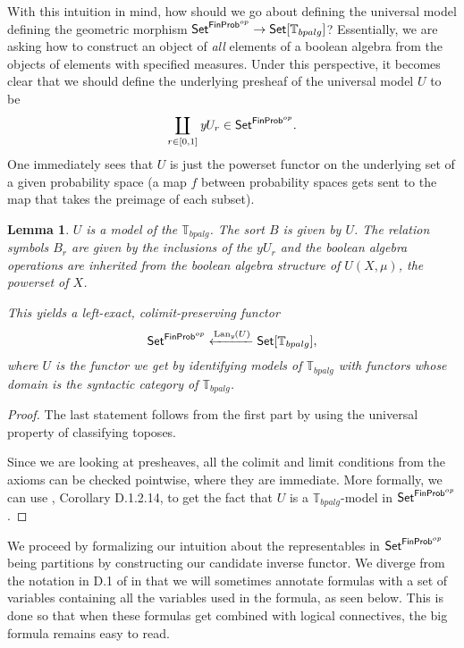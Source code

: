 \documentclass[a4paper]{amsproc}
\theoremstyle{plain}
\newtheorem{lemma}[theorem]{Lemma}
\theoremstyle{definition}
\theoremstyle{remark}
\numberwithin{equation}{section}
\newcommand{\y}{\textit{y}}
\DeclareMathOperator{\Lan}{Lan}
\newcommand{\Set}{\textup{\textsf{Set}}}
\newcommand{\FinProb}{\textup{\textsf{FinProb}}}
\begin{document}
With this intuition in mind, how should we go about defining the universal model defining the geometric morphism $\Set^{\FinProb^{op}} \to \Set[\mathbb{T}_{bpalg}]$? Essentially, we are asking how to construct an object of \emph{all} elements of a boolean algebra from the objects of elements with specified measures. Under this perspective, it becomes clear that we should define the underlying presheaf of the universal model $U$ to be
\[
\coprod_{r \in [0,1]} \y U_r \in \Set^{\FinProb^{op}} .
\]
One immediately sees that $U$ is just the powerset functor on the underlying set of a given probability space (a map $f$ between probability spaces gets sent to the map that takes the preimage of each subset).

\begin{lemma} \label{universal model}
$U$ is a model of the $\mathbb{T}_{bpalg}$. The sort $B$ is given by $U$. The relation symbols $B_r$ are given by the inclusions of the $\y U_r$ and the boolean algebra operations are inherited from the boolean algebra structure of $U(X, \mu)$, the powerset of $X$.

This yields a left-exact, colimit-preserving functor
\[
    \Set^{\FinProb^{op}} \xleftarrow{\Lan_{\y}(U)} \Set[\mathbb{T}_{bpalg}],
\]
where $U$ is the functor we get by identifying models of $\mathbb{T}_{bpalg}$ with functors whose domain is the syntactic category of $\mathbb{T}_{bpalg}$.
\end{lemma}
\begin{proof}
The last statement follows from the first part by using the universal property of classifying toposes.

Since we are looking at presheaves, all the colimit and limit conditions from the axioms can be checked pointwise, where they are immediate. More formally, we can use \cite{johnstone2002sketches2}, Corollary D.1.2.14, to get the fact that $U$ is a $\mathbb{T}_{bpalg}$-model in $\Set^{\FinProb^{op}}$.
\end{proof}

We proceed by formalizing our intuition about the representables in $\Set^{\FinProb^{op}}$ being partitions by constructing our candidate inverse functor. We diverge from the notation in D.1 of \cite{johnstone2002sketches2} in that we will sometimes annotate formulas with a set of variables containing all the variables used in the formula, as seen below. This is done so that when these formulas get combined with logical connectives, the big formula remains easy to read.
\end{document}
